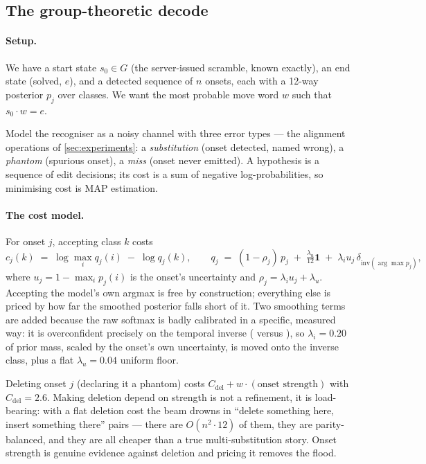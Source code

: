 \subsection{The group-theoretic decode}
\label{sec:reconstruct}

\paragraph{Setup.} We have a start state $s_0 \in G$ (the server-issued
scramble, known exactly), an end state (solved, $e$), and a detected
sequence of $n$ onsets, each with a 12-way posterior $p_j$ over classes.
We want the most probable move word $w$ such that $s_0 \cdot w = e$.

Model the recogniser as a noisy channel with three error types --- the
alignment operations of \cref{sec:experiments}: a \emph{substitution} (onset
detected, named wrong), a \emph{phantom} (spurious onset), a \emph{miss}
(onset never emitted). A hypothesis is a sequence of edit decisions; its cost
is a sum of negative log-probabilities, so minimising cost is MAP estimation.

\paragraph{The cost model.} For onset $j$, accepting class $k$ costs
\begin{equation}
c_j(k) \;=\; \log \max_i q_j(i) \;-\; \log q_j(k),
\qquad
q_j \;=\; (1-\rho_j)\,p_j \;+\; \tfrac{\lambda_u}{12}\mathbf{1}
        \;+\; \lambda_i u_j\, \delta_{\mathrm{inv}(\arg\max p_j)},
\label{eq:acceptcost}
\end{equation}
where $u_j = 1 - \max_i p_j(i)$ is the onset's uncertainty and
$\rho_j = \lambda_i u_j + \lambda_u$. Accepting the model's own argmax is
free by construction; everything else is priced by how far the smoothed
posterior falls short of it. Two smoothing terms are added because the raw
softmax is badly calibrated in a specific, measured way: it is overconfident
precisely on the temporal inverse ( versus ), so
$\lambda_i = 0.20$ of prior mass, scaled by the onset's own uncertainty, is
moved onto the inverse class, plus a flat $\lambda_u = 0.04$ uniform floor.

Deleting onset $j$ (declaring it a phantom) costs
$C_{\mathrm{del}} + w\cdot(\text{onset strength})$ with
$C_{\mathrm{del}}=2.6$. Making deletion depend on strength is not a
refinement, it is load-bearing: with a flat deletion cost the beam drowns in
``delete something here, insert something there'' pairs --- there are
$O(n^2\cdot 12)$ of them, they are parity-balanced, and they are all cheaper
than a true multi-substitution story. Onset strength is genuine evidence
against deletion and pricing it removes the flood.

